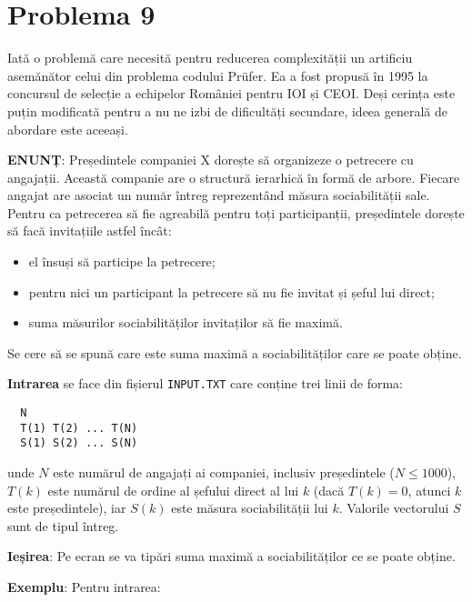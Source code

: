 \section{Problema 9}

Iată o problemă care necesită pentru reducerea complexității un artificiu
asemănător celui din problema codului Prüfer. Ea a fost propusă în 1995 la
concursul de selecție a echipelor României pentru IOI și CEOI. Deși cerința
este puțin modificată pentru a nu ne izbi de dificultăți secundare, ideea
generală de abordare este aceeași.

{\bf ENUNȚ}: Președintele companiei X dorește să organizeze o petrecere cu
angajații. Această companie are o structură ierarhică în formă de
arbore. Fiecare angajat are asociat un număr întreg reprezentând măsura
sociabilității sale. Pentru ca petrecerea să fie agreabilă pentru toți
participanții, președintele dorește să facă invitațiile astfel încât:

\begin{itemize}

\item el însuși să participe la petrecere;

\item pentru nici un participant la petrecere să nu fie invitat și șeful lui
  direct;

\item suma măsurilor sociabilităților invitaților să fie maximă.

\end{itemize}

Se cere să se spună care este suma maximă a sociabilităților care se poate obține.

{\bf Intrarea} se face din fișierul {\tt INPUT.TXT} care conține trei linii de
forma:

\begin{verbatim}
  N
  T(1) T(2) ... T(N)
  S(1) S(2) ... S(N)
\end{verbatim}

unde $N$ este numărul de angajați ai companiei, inclusiv președintele ($N \leq
1000$), $T(k)$ este numărul de ordine al șefului direct al lui $k$ (dacă $T(k)
= 0$, atunci $k$ este președintele), iar $S(k)$ este măsura sociabilității lui
$k$. Valorile vectorului $S$ sunt de tipul întreg.

{\bf Ieșirea}: Pe ecran se va tipări suma maximă a sociabilităților ce se
poate obține.

{\bf Exemplu}: Pentru intrarea:

